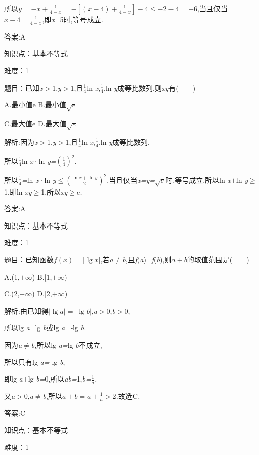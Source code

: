 \documentclass{article} %
\begin{document}
所以$y=-x+\frac{1}{4-x}=-[(x-4)+\frac{1}{4-x}]-4 \le -2-4=-6$,当且仅当$x-4=\frac{1}{4-x}$,即\textit{x=}5时,等号成立\textit{.}

 答案:A

知识点：基本不等式

难度：1

 题目：已知\textit{x$>$}1,\textit{y$>$}1,且$\frac{1}{4}$ln \textit{x},$\frac{1}{4}$,ln \textit{y}成等比数列,则\textit{xy}有(\textit{　　})

 A.最小值e B.最小值$\sqrt{e}$

 C.最大值e D.最大值$\sqrt{e}$

 解析:因为\textit{x$>$}1,\textit{y$>$}1,且$\frac{1}{4}$ln \textit{x},$\frac{1}{4}$,ln \textit{y}成等比数列,

所以$\frac{1}{4}$ln \textit{x}·ln \textit{y=}${(\frac{1}{4})}^2$\textit{.}

所以$\frac{1}{4}$\textit{=}ln \textit{x}·ln \textit{y}$\mathrm{\le} {(\frac{\ln x +\ln y}{2})}^2$,当且仅当\textit{x=y=}$\sqrt{e}$时,等号成立,所以ln \textit{x$+$}ln \textit{y}$\mathrm{\ge}$1,即ln \textit{xy}$\mathrm{\ge}$1,所以\textit{xy}$\mathrm{\ge}$e\textit{.}

 答案:A

知识点：基本不等式

难度：1

 题目：已知函数$f(x)=|\lg x|$,若\textit{a}$\mathrm{\neq}$\textit{b},且\textit{f}(\textit{a})\textit{=f}(\textit{b}),则\textit{$a+b$}的取值范围是(\textit{　　})

 A.(1,\textit{$+\infty$}) B.[1,\textit{$+\infty$}) 

 C.(2,\textit{$+\infty$}) D.[2,\textit{$+\infty$})

 解析:由已知得$|\lg a|=|\lg b|$,\textit{a$>$}0,\textit{b$>$}0,

所以lg \textit{a=}lg \textit{b}或lg \textit{a=-}lg \textit{b.}

因为\textit{a}$\mathrm{\neq}$\textit{b},所以lg \textit{a=}lg \textit{b}不成立,

所以只有lg \textit{a=-}lg \textit{b},

即lg \textit{a$+$}lg \textit{b=}0,所以\textit{ab=}1,\textit{b=}$\frac{1}{a}$\textit{.}

又\textit{a$>$}0,\textit{a}$\mathrm{\neq}$\textit{b},所以\textit{$a+b=a+\frac{1}{a}$}\textit{$>$}2\textit{.}故选C\textit{.}

 答案:C

知识点：基本不等式

难度：1
\end{document}
